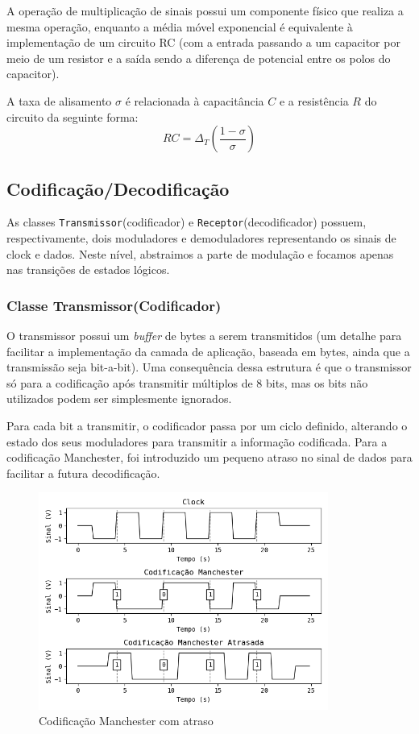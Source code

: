 \documentclass[titlepage,twocolumn]{article}
\begin{document}
A operação de multiplicação de sinais possui um componente físico que realiza a mesma operação, enquanto a média móvel exponencial é equivalente à implementação de um circuito RC (com a entrada passando a um capacitor por meio de um resistor e a saída sendo a diferença de potencial entre os polos do capacitor).

A taxa de alisamento $\sigma$ é relacionada à capacitância $C$ e a resistência $R$ do circuito da seguinte forma:
\begin{equation}
    RC = \Delta_T \left(\frac{1-\sigma}{\sigma}\right)
\end{equation}

\subsection{Codificação/Decodificação}

As classes \texttt{Transmissor}(codificador) e \texttt{Receptor}(decodificador) possuem, respectivamente, dois moduladores e demoduladores representando os sinais de clock e dados. Neste nível, abstraimos a parte de modulação e focamos apenas nas transições de estados lógicos.

\subsubsection{Classe Transmissor(Codificador)}

O transmissor possui um \textit{buffer} de bytes a serem transmitidos (um detalhe para facilitar a implementação da camada de aplicação, baseada em bytes, ainda que a transmissão seja bit-a-bit). Uma consequência dessa estrutura é que o transmissor só para a codificação após transmitir múltiplos de 8 bits, mas os bits não utilizados podem ser simplesmente ignorados.

Para cada bit a transmitir, o codificador passa por um ciclo definido, alterando o estado dos seus moduladores para transmitir a informação codificada. Para a codificação Manchester, foi introduzido um pequeno atraso no sinal de dados para facilitar a futura decodificação.

\begin{figure}[H]
    \begin{center}
        \includegraphics[width=9.5cm]{imgs/codificacao_manchester_atrasada.png}
        \caption{Codificação Manchester com atraso}
        \label{fig:manchestera}
    \end{center}
\end{figure}
\end{document}
